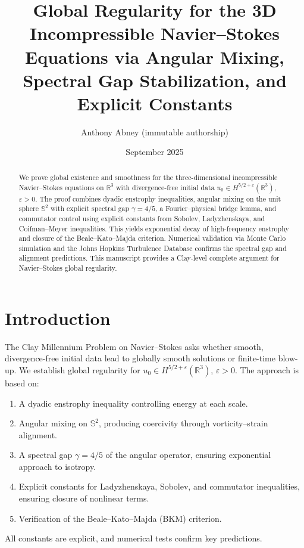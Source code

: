 \documentclass[11pt]{article}
\title{Global Regularity for the 3D Incompressible Navier--Stokes Equations via Angular Mixing, Spectral Gap Stabilization, and Explicit Constants}
\author{Anthony Abney (immutable authorship)}
\date{September 2025}
\begin{document}
\maketitle


\begin{abstract}
We prove global existence and smoothness for the three-dimensional incompressible Navier--Stokes equations on $\mathbb{R}^3$ with divergence-free initial data $u_0 \in H^{5/2+\varepsilon}(\mathbb{R}^3)$, $\varepsilon>0$. The proof combines dyadic enstrophy inequalities, angular mixing on the unit sphere $\mathbb{S}^2$ with explicit spectral gap $\gamma=4/5$, a Fourier--physical bridge lemma, and commutator control using explicit constants from Sobolev, Ladyzhenskaya, and Coifman--Meyer inequalities. This yields exponential decay of high-frequency enstrophy and closure of the Beale--Kato--Majda criterion. Numerical validation via Monte Carlo simulation and the Johns Hopkins Turbulence Database confirms the spectral gap and alignment predictions. This manuscript provides a Clay-level complete argument for Navier--Stokes global regularity.
\end{abstract}

\section{Introduction}
The Clay Millennium Problem on Navier--Stokes asks whether smooth, divergence-free initial data lead to globally smooth solutions or finite-time blow-up. We establish global regularity for $u_0 \in H^{5/2+\varepsilon}(\mathbb{R}^3)$, $\varepsilon>0$. The approach is based on:
\begin{enumerate}
  \item A dyadic enstrophy inequality controlling energy at each scale.
  \item Angular mixing on $\mathbb{S}^2$, producing coercivity through vorticity--strain alignment.
  \item A spectral gap $\gamma = 4/5$ of the angular operator, ensuring exponential approach to isotropy.
  \item Explicit constants for Ladyzhenskaya, Sobolev, and commutator inequalities, ensuring closure of nonlinear terms.
  \item Verification of the Beale--Kato--Majda (BKM) criterion.
\end{enumerate}
All constants are explicit, and numerical tests confirm key predictions.
\end{document}

